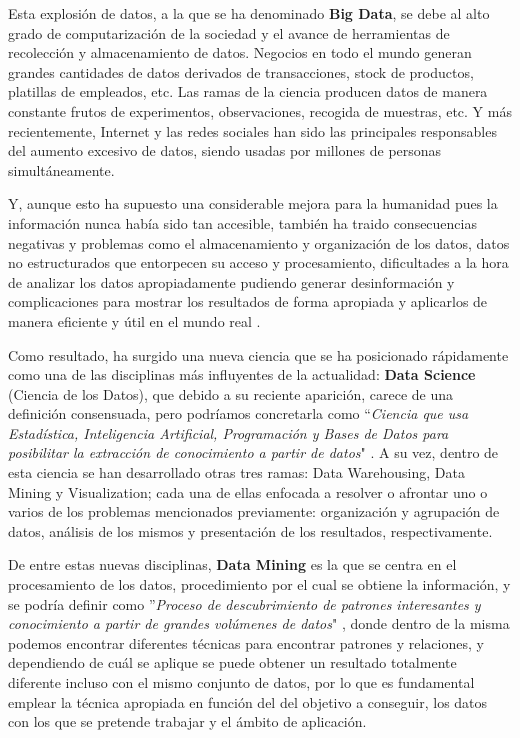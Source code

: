 \documentclass[3p,twocolumn]{elsarticle}
\begin{document}
Esta explosión de datos, a la que se ha denominado \textbf{Big Data}, se debe al alto grado de computarización de la sociedad y el avance de herramientas de recolección y almacenamiento de datos. Negocios en todo el mundo generan grandes cantidades de datos derivados de transacciones, stock de productos,  platillas de empleados, etc. Las ramas de la ciencia producen datos de manera constante frutos de experimentos, observaciones, recogida de muestras, etc. Y más recientemente, Internet y las redes sociales han sido las principales responsables del aumento excesivo de datos, siendo usadas por millones de personas simultáneamente.

Y, aunque esto ha supuesto una considerable mejora para la humanidad pues la información nunca había sido tan accesible, también ha traido consecuencias negativas y problemas como el almacenamiento y organización de los datos, datos no estructurados que entorpecen su acceso y procesamiento, dificultades a la hora de analizar los datos apropiadamente pudiendo generar desinformación y complicaciones para mostrar los resultados de forma apropiada y aplicarlos de manera eficiente y útil en el mundo real \cite{3}.

Como resultado, ha surgido una nueva ciencia que se ha posicionado rápidamente como una de las disciplinas más influyentes de la actualidad: \textbf{Data Science} (Ciencia de los Datos), que debido a su reciente aparición, carece de una definición consensuada, pero podríamos concretarla como ``\textit{Ciencia que usa Estadística, Inteligencia Artificial, Programación y Bases de Datos para posibilitar la extracción de conocimiento a partir de datos}" \cite{4}. A su vez, dentro de esta ciencia se han desarrollado otras tres ramas: Data Warehousing, Data Mining y Visualization; cada una de ellas enfocada a resolver o afrontar uno o varios de los problemas mencionados previamente: organización y agrupación de datos, análisis de los mismos y presentación de los resultados, respectivamente.

De entre estas nuevas disciplinas, \textbf{Data Mining} es la que se centra en el procesamiento de los datos, procedimiento por el cual se obtiene la información, y se podría definir como ''\textit{Proceso de descubrimiento de patrones interesantes y conocimiento a partir de grandes volúmenes de datos}" \cite{5}, donde dentro de la misma podemos encontrar diferentes técnicas para encontrar patrones y relaciones, y dependiendo de cuál se aplique se puede obtener un resultado totalmente diferente incluso con el mismo conjunto de datos, por lo que es fundamental emplear la técnica apropiada en función del del objetivo a conseguir, los datos con los que se pretende trabajar y el ámbito de aplicación.
\end{document}
